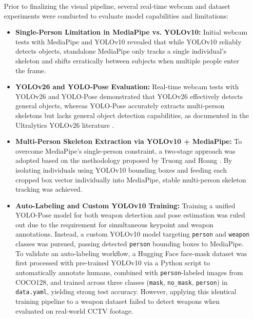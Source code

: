 \documentclass[11pt,a4paper]{article}
\begin{document}
	Prior to finalizing the visual pipeline, several real-time webcam and dataset experiments were conducted to evaluate model capabilities and limitations:
	\begin{itemize}[leftmargin=*,noitemsep,topsep=2pt]
		\item \textbf{Single-Person Limitation in MediaPipe vs. YOLOv10:} Initial webcam tests with MediaPipe and YOLOv10 revealed that while YOLOv10 reliably detects objects, standalone MediaPipe only tracks a single individual's skeleton and shifts erratically between subjects when multiple people enter the frame.
		\item \textbf{YOLOv26 and YOLO-Pose Evaluation:} Real-time webcam tests with YOLOv26 and YOLO-Pose demonstrated that YOLOv26 effectively detects general objects, whereas YOLO-Pose accurately extracts multi-person skeletons but lacks general object detection capabilities, as documented in the Ultralytics YOLOv26 literature \cite{jocher2026}.
		\item \textbf{Multi-Person Skeleton Extraction via YOLOv10 + MediaPipe:} To overcome MediaPipe's single-person constraint, a two-stage approach was adopted based on the methodology proposed by Truong and Hoang \cite{TRUONG2025111987}. By isolating individuals using YOLOv10 bounding boxes and feeding each cropped box vector individually into MediaPipe, stable multi-person skeleton tracking was achieved.
		\item \textbf{Auto-Labeling and Custom YOLOv10 Training:} Training a unified YOLO-Pose model for both weapon detection and pose estimation was ruled out due to the requirement for simultaneous keypoint and weapon annotations. Instead, a custom YOLOv10 model targeting \texttt{person} and \texttt{weapon} classes was pursued, passing detected \texttt{person} bounding boxes to MediaPipe. To validate an auto-labeling workflow, a Hugging Face face-mask dataset was first processed with pre-trained YOLOv10 via a Python script to automatically annotate humans, combined with \texttt{person}-labeled images from COCO128, and trained across three classes (\texttt{mask}, \texttt{no\_mask}, \texttt{person}) in \texttt{data.yaml}, yielding strong test accuracy. However, applying this identical training pipeline to a weapon dataset failed to detect weapons when evaluated on real-world CCTV footage.
	\end{itemize}
	 
	
	
\end{document}
